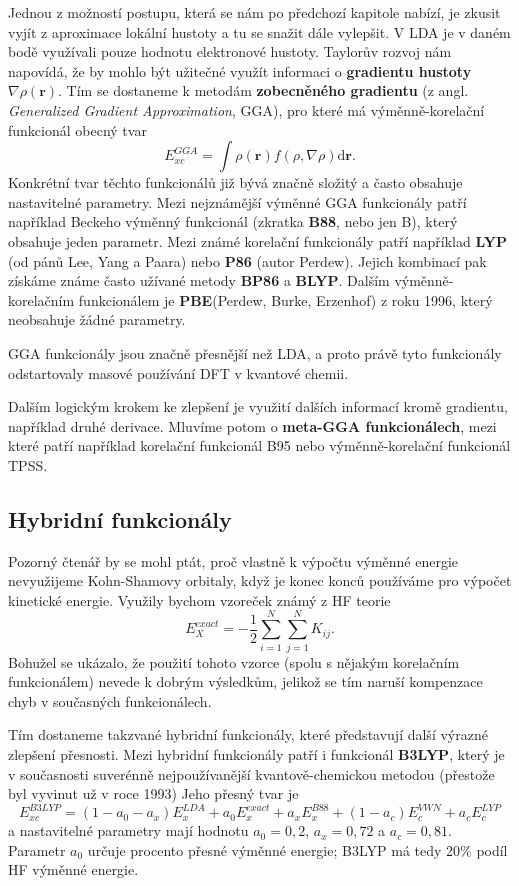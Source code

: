 Jednou z možností postupu, která se nám po předchozí kapitole nabízí, je zkusit vyjít z aproximace lokální hustoty a tu se snažit dále vylepšit. V LDA je v daném bodě využívali pouze hodnotu elektronové hustoty. Taylorův rozvoj nám napovídá, že by mohlo být užitečné využít informaci o \textbf{gradientu hustoty} $\nabla\rho(\textbf{r})$. 
Tím se dostaneme k metodám \textbf{zobecněného gradientu} (z angl. \textit{Generalized Gradient Approximation}, GGA), pro které má výměnně-korelační funkcionál obecný tvar
\begin{equation}
E_{xc}^{GGA}=\int \rho(\textbf{r})f(\rho,\nabla\rho) \mathrm{d}\textbf{r} .
\end{equation}
Konkrétní tvar těchto funkcionálů již bývá značně složitý a často obsahuje nastavitelné parametry. Mezi nejznámější výměnné GGA funkcionály patří například Beckeho výměnný funkcionál (zkratka \textbf{B88}, nebo jen B), který obsahuje jeden parametr. Mezi známé korelační funkcionály patří například \textbf{LYP} (od pánů Lee, Yang a Paara) nebo \textbf{P86} (autor Perdew). Jejich kombinací pak získáme známe často užívané metody \textbf{BP86} a \textbf{BLYP}. Dalším výměnně-korelačním funkcionálem je \textbf{PBE}(Perdew, Burke, Erzenhof) z roku 1996, který neobsahuje žádné parametry.

GGA funkcionály jsou značně přesnější než LDA, a proto právě tyto funkcionály odstartovaly masové používání DFT v kvantové chemii.

Dalším logickým krokem ke zlepšení je využití dalších informací kromě gradientu, například druhé derivace. Mluvíme potom o \textbf{meta-GGA funkcionálech}, mezi které patří například korelační funkcionál B95 nebo výměnně-korelační funkcionál TPSS.

\subsection{Hybridní funkcionály}
Pozorný čtenář by se mohl ptát, proč vlastně k výpočtu výměnné energie nevyužijeme Kohn-Shamovy orbitaly, když je konec konců používáme pro výpočet kinetické energie. Využily bychom vzoreček známý z HF teorie 
\begin{equation}
E_X^{exact}=-\frac{1}{2}\sum_{i=1}^N\sum_{j=1}^N K_{ij} . 
\end{equation}
Bohužel se ukázalo, že použití tohoto vzorce (spolu s nějakým korelačním funkcionálem) nevede k dobrým výsledkům, jelikož se tím naruší kompenzace chyb v současných funkcionálech.

Tím dostaneme takzvané hybridní funkcionály, které představují další výrazné zlepšení přesnosti.
Mezi hybridní funkcionály patří i funkcionál \textbf{B3LYP}, který je v současnosti suverénně nejpoužívanější kvantově-chemickou metodou (přestože byl vyvinut už v roce 1993)
Jeho přesný tvar je
\begin{equation}
E_{xc}^{B3LYP}=(1-a_0-a_x)E_x^{LDA}+a_0E_x^{exact}+a_xE_x^{B88}+(1-a_c)E_c^{VWN}+a_c E_c^{LYP}
\end{equation}
a nastavitelné parametry mají hodnotu $a_0=0,2$, $a_x=0,72$ a $a_c=0,81$.
Parametr $a_0$ určuje procento přesné výměnné energie; B3LYP má tedy 20\% podíl HF výměnné energie.

